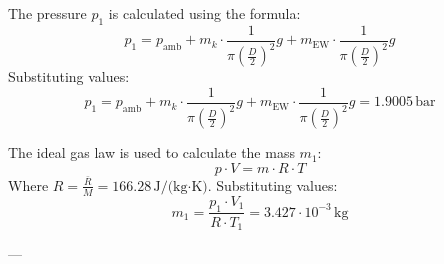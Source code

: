 The pressure \( p_1 \) is calculated using the formula:  
\[
p_1 = p_{\text{amb}} + m_k \cdot \frac{1}{\pi \left( \frac{D}{2} \right)^2} g + m_{\text{EW}} \cdot \frac{1}{\pi \left( \frac{D}{2} \right)^2} g
\]  
Substituting values:  
\[
p_1 = p_{\text{amb}} + m_k \cdot \frac{1}{\pi \left( \frac{D}{2} \right)^2} g + m_{\text{EW}} \cdot \frac{1}{\pi \left( \frac{D}{2} \right)^2} g = 1.9005 \, \text{bar}
\]  

The ideal gas law is used to calculate the mass \( m_1 \):  
\[
p \cdot V = m \cdot R \cdot T
\]  
Where \( R = \frac{\bar{R}}{M} = 166.28 \, \text{J/(kg·K)} \).  
Substituting values:  
\[
m_1 = \frac{p_1 \cdot V_1}{R \cdot T_1} = 3.427 \cdot 10^{-3} \, \text{kg}
\]  

---